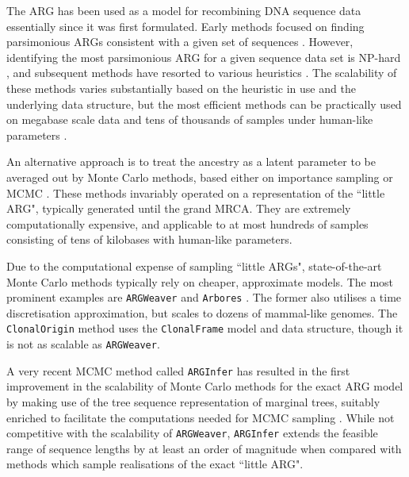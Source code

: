 \documentclass{article}
\begin{document}
The ARG has been used as a model for recombining DNA sequence data essentially
since it was first formulated. Early methods focused on finding parsimonious
ARGs consistent with a given set of
sequences \citep{hein1990reconstructing, lyngso2005minimum}.
However, identifying the most parsimonious ARG for a given sequence data set
is NP-hard \citep{wang2001perfect}, and subsequent methods have resorted to
various heuristics \citep{fallon2013acg, hein1993heuristic, ignatieva2021kwarg,
kelleher2019inferring, minichiello2006mapping, mirzaei2017rent,
parida2008estimating, song2005efficient, thao2019hybrid, zhang2021biobank}.
The scalability of these methods varies substantially based on the heuristic in use
and the underlying data structure, but the most efficient methods can be practically
used on megabase scale data and tens of thousands of samples under human-like
parameters \citep{kelleher2019inferring, zhang2021biobank}.

An alternative approach is to treat the ancestry as a latent parameter to be averaged out
by Monte Carlo methods, based either on importance sampling
\citep{griffiths1996ancestral, fearnhead2001estimating, jenkins2011inference}
or MCMC \citep{kuhner2000maximum, nielsen2000estimation, wang2008bayesian}.
These methods invariably operated on a representation of the ``little ARG", typically
generated until the grand MRCA. They are extremely computationally expensive,
and applicable to at most hundreds of samples consisting of tens of kilobases with
human-like parameters.

Due to the computational expense of sampling ``little ARGs", state-of-the-art
Monte Carlo methods typically rely on cheaper, approximate models.
The most prominent examples are \texttt{ARGWeaver} \citep{rasmussen2014genome}
and \texttt{Arbores} \citep{heine2018bridging}. The former also utilises a time
discretisation approximation, but scales to dozens of mammal-like genomes.
The \texttt{ClonalOrigin} method \citep{didelot2010inference,
medinaaguayo2020speeding} uses the \texttt{ClonalFrame}
model and data structure, though it is not as scalable as \texttt{ARGWeaver}.

A very recent MCMC method called \texttt{ARGInfer} has resulted in the first
improvement in the scalability of Monte Carlo methods for the exact ARG model
by making use of the tree sequence representation of marginal trees, suitably enriched
to facilitate the computations needed for MCMC sampling \citep{mahmoudi2021inference}.
While not competitive with the scalability of \texttt{ARGWeaver}, \texttt{ARGInfer} extends
the feasible range of sequence lengths by at least an order of magnitude when
compared with methods which sample realisations of the exact ``little ARG".
\end{document}
